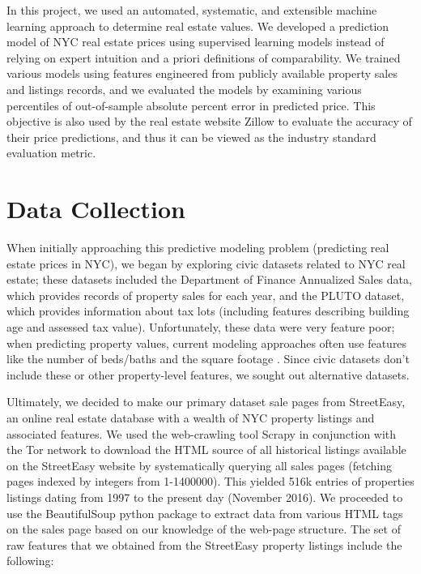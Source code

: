 \documentclass[journal]{IEEEtran}
\begin{document}
In this project, we used an automated, systematic, and extensible machine learning approach to determine real estate values. We developed a prediction model of NYC real estate prices using supervised learning models instead of relying on expert intuition and a priori definitions of comparability. We trained various models using features engineered from publicly available property sales and listings records, and we evaluated the models by examining various percentiles of out-of-sample absolute percent error in predicted price. This objective is also used by the real estate website Zillow to evaluate the accuracy of their price predictions, and thus it can be viewed as the industry standard evaluation metric.

\section{Data Collection}

When initially approaching this predictive modeling problem (predicting real estate prices in NYC), we began by exploring civic datasets related to NYC real estate; these datasets included the Department of Finance Annualized Sales data, which provides records of property sales for each year, and the PLUTO dataset, which provides information about tax lots (including features describing building age and assessed tax value). Unfortunately, these data were very feature poor; when predicting property values, current modeling approaches often use features like the number of beds/baths and the square footage \cite{pagourtzi2003real}. Since civic datasets don't include these or other property-level features, we sought out alternative datasets.

Ultimately, we decided to make our primary dataset sale pages from StreetEasy, an online real estate database with a wealth of NYC property listings and associated features. We used the web-crawling tool Scrapy in conjunction with the Tor network to download the HTML source of all historical listings available on the StreetEasy website by systematically querying all sales pages (fetching pages indexed by integers from 1-1400000). This yielded 516k entries of properties listings dating from 1997 to the present day (November 2016). We proceeded to use the BeautifulSoup python package to extract data from various HTML tags on the sales page based on our knowledge of the web-page structure. The set of raw features that we obtained from the StreetEasy property listings include the following:
\end{document}
